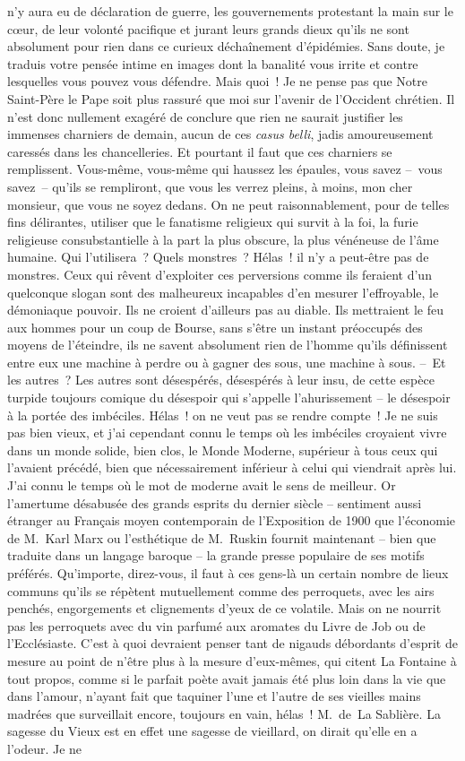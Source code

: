 \documentclass[french,twoside]{book} %
\begin{document}
n’y aura eu de déclaration de guerre, les gouvernements protestant la main sur le cœur, de leur volonté pacifique et jurant leurs grands dieux qu’ils ne sont absolument pour rien dans ce curieux déchaînement d’épidémies. Sans doute, je traduis votre pensée intime en images dont la banalité vous irrite et contre lesquelles vous pouvez vous défendre. Mais quoi ! Je ne pense pas que Notre Saint-Père le Pape soit plus rassuré que moi sur l’avenir de l’Occident chrétien. Il n’est donc nullement exagéré de conclure que rien ne saurait justifier les immenses charniers de demain, aucun de ces \emph{casus belli}, jadis amoureusement caressés dans les chancelleries. Et pourtant il faut que ces charniers se remplissent. Vous-même, vous-même qui haussez les épaules, vous savez – vous savez – qu’ils se rempliront, que vous les verrez pleins, à moins, mon cher monsieur, que vous ne soyez dedans. On ne peut raisonnablement, pour de telles fins délirantes, utiliser que le fanatisme religieux qui survit à la foi, la furie religieuse consubstantielle à la part la plus obscure, la plus vénéneuse de l’âme humaine. Qui l’utilisera ? Quels monstres ? Hélas ! il n’y a peut-être pas de monstres. Ceux qui rêvent d’exploiter ces perversions comme ils feraient d’un quelconque slogan sont des malheureux incapables d’en mesurer l’effroyable, le démoniaque pouvoir. Ils ne croient d’ailleurs pas au diable. Ils mettraient le feu aux hommes pour un coup de Bourse, sans s’être un instant préoccupés des moyens de l’éteindre, ils ne savent absolument rien de l’homme qu’ils définissent entre eux une machine à perdre ou à gagner des sous, une machine à sous. – Et les autres ? Les autres sont désespérés, désespérés à leur insu, de cette espèce turpide toujours comique du désespoir qui s’appelle l’ahurissement – le désespoir à la portée des imbéciles. Hélas ! on ne veut pas se rendre compte ! Je ne suis pas bien vieux, et j’ai cependant connu le temps où les imbéciles croyaient vivre dans un monde solide, bien clos, le Monde Moderne, supérieur à tous ceux qui l’avaient précédé, bien que nécessairement inférieur à celui qui viendrait après lui. J’ai connu le temps où le mot de moderne avait le sens de meilleur. Or l’amertume désabusée des grands esprits du dernier siècle – sentiment aussi étranger au Français moyen contemporain de l’Exposition de 1900 que l’économie de M. Karl Marx ou l’esthétique de M. Ruskin fournit maintenant – bien que traduite dans un langage baroque – la grande presse populaire de ses motifs préférés. Qu’importe, direz-vous, il faut à ces gens-là un certain nombre de lieux communs qu’ils se répètent mutuellement comme des perroquets, avec les airs penchés, engorgements et clignements d’yeux de ce volatile. Mais on ne nourrit pas les perroquets avec du vin parfumé aux aromates du Livre de Job ou de l’Ecclésiaste. C’est à quoi devraient penser tant de nigauds débordants d’esprit de mesure au point de n’être plus à la mesure d’eux-mêmes, qui citent La Fontaine à tout propos, comme si le parfait poète avait jamais été plus loin dans la vie que dans l’amour, n’ayant fait que taquiner l’une et l’autre de ses vieilles mains madrées que surveillait encore, toujours en vain, hélas ! M. de La Sablière. La sagesse du Vieux est en effet une sagesse de vieillard, on dirait qu’elle en a l’odeur. Je ne 
\end{document}
